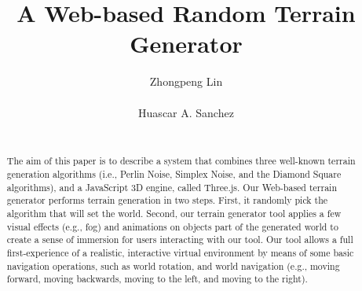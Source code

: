 \documentclass{acm_proc_article-sp}
\begin{document}
\title{A Web-based Random Terrain Generator}
\author{
  \alignauthor Zhongpeng Lin \\
   \\
  \alignauthor Huascar A. Sanchez \\
   \\
}

\maketitle
\begin{abstract}
The aim of this paper is to describe a system that combines three well-known terrain generation algorithms (i.e., Perlin Noise, Simplex Noise, and the Diamond Square algorithms), and a JavaScript 3D engine, called Three.js. Our Web-based terrain generator performs terrain generation in two steps. First, it randomly pick the algorithm that will set the world. Second, our terrain generator tool applies a few visual effects (e.g., fog) and animations on objects part of the generated world to create a sense of immersion for users interacting with our tool. Our tool allows a full first-experience of a realistic, interactive virtual environment by means of some basic navigation operations, such as world rotation, and world navigation (e.g., moving forward, moving backwards, moving to the left, and moving to the right). 
\end{abstract}












\end{document}
